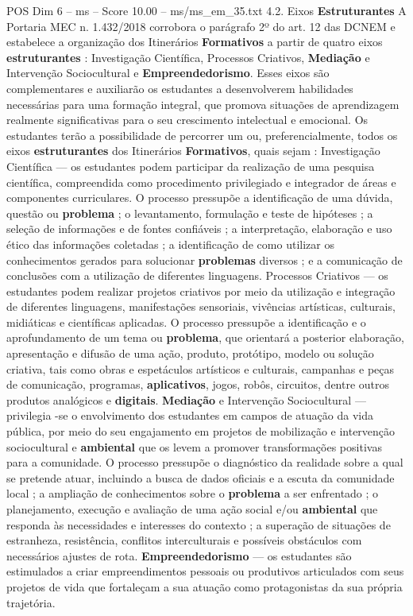 \begin{textsample}{POS Dim 6 – ms – Score 10.00 – ms/ms\_em\_35.txt}  \label{ex:f6_pos_054}
4.2.
Eixos \textbf{Estruturantes} A Portaria MEC n. 1.432/2018 corrobora o parágrafo 2º do art. 12 das DCNEM e estabelece a organização dos Itinerários \textbf{Formativos} a partir de quatro eixos \textbf{estruturantes} : Investigação Científica, Processos Criativos, \textbf{Mediação} e Intervenção Sociocultural e \textbf{Empreendedorismo}.
Esses eixos são complementares e auxiliarão os estudantes a desenvolverem habilidades necessárias para uma formação integral, que promova situações de aprendizagem realmente significativas para o seu crescimento intelectual e emocional.
Os estudantes terão a possibilidade de percorrer um ou, preferencialmente, todos os eixos \textbf{estruturantes} dos Itinerários \textbf{Formativos}, quais sejam : Investigação Científica — os estudantes podem participar da realização de uma pesquisa científica, compreendida como procedimento privilegiado e integrador de áreas e componentes curriculares.
O processo pressupõe a identificação de uma dúvida, questão ou \textbf{problema} ; o levantamento, formulação e teste de hipóteses ; a seleção de informações e de fontes confiáveis ; a interpretação, elaboração e uso ético das informações coletadas ; a identificação de como utilizar os conhecimentos gerados para solucionar \textbf{problemas} diversos ; e a comunicação de conclusões com a utilização de diferentes linguagens.
Processos Criativos — os estudantes podem realizar projetos criativos por meio da utilização e integração de diferentes linguagens, manifestações sensoriais, vivências artísticas, culturais, midiáticas e científicas aplicadas.
O processo pressupõe a identificação e o aprofundamento de um tema ou \textbf{problema}, que orientará a posterior elaboração, apresentação e difusão de uma ação, produto, protótipo, modelo ou solução criativa, tais como obras e espetáculos artísticos e culturais, campanhas e peças de comunicação, programas, \textbf{aplicativos}, jogos, robôs, circuitos, dentre outros produtos analógicos e \textbf{digitais}. \textbf{Mediação} e Intervenção Sociocultural — privilegia -se o envolvimento dos estudantes em campos de atuação da vida pública, por meio do seu engajamento em projetos de mobilização e intervenção sociocultural e \textbf{ambiental} que os levem a promover transformações positivas para a comunidade.
O processo pressupõe o diagnóstico da realidade sobre a qual se pretende atuar, incluindo a busca de dados oficiais e a escuta da comunidade local ; a ampliação de conhecimentos sobre o \textbf{problema} a ser enfrentado ; o planejamento, execução e avaliação de uma ação social e/ou \textbf{ambiental} que responda às necessidades e interesses do contexto ; a superação de situações de estranheza, resistência, conflitos interculturais e possíveis obstáculos com necessários ajustes de rota. \textbf{Empreendedorismo} — os estudantes são estimulados a criar empreendimentos pessoais ou produtivos articulados com seus projetos de vida que fortaleçam a sua atuação como protagonistas da sua própria trajetória.

\end{textsample}
